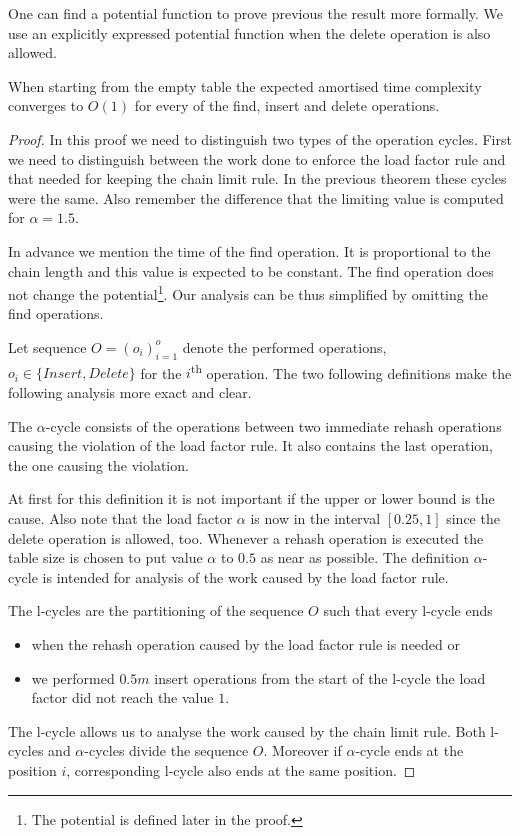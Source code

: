 One can find a potential function to prove previous the result more formally. We use an explicitly expressed potential function when the delete operation is also allowed.

\begin{theorem}
When starting from the empty table the expected amortised time complexity converges to $O(1)$ for every of the find, insert and delete operations.
\end{theorem}
\begin{proof}
In this proof we need to distinguish two types of the operation cycles. First we need to distinguish between the work done to enforce the load factor rule and that needed for keeping the chain limit rule. In the previous theorem these cycles were the same. Also remember the difference that the limiting value is computed for $\alpha = 1.5$.

In advance we mention the time of the find operation. It is proportional to the chain length and this value is expected to be constant. The find operation does not change the potential\footnote{The potential is defined later in the proof.}. Our analysis can be thus simplified by omitting the find operations.

Let sequence $O = (o_i)_{i=1}^o$ denote the performed operations, $o_i \in \lbrace Insert, Delete \rbrace$ for the $i$\textsuperscript{th} operation. The two following definitions make the following analysis more exact and clear.

\begin{definition}
The $\alpha$-cycle consists of the operations between two immediate rehash operations causing the violation of the load factor rule. It also contains the last operation, the one causing the violation.
\end{definition}
At first for this definition it is not important if the upper or lower bound is the cause. Also note that the load factor $\alpha$ is now in the interval $\left[0.25, 1\right]$ since the delete operation is allowed, too. Whenever a rehash operation is executed the table size is chosen to put value $\alpha$ to $0.5$ as near as possible. The definition $\alpha$-cycle is intended for analysis of the work caused by the load factor rule.

\begin{definition}[l-cycle]
The l-cycles are the partitioning of the sequence $O$ such that every l-cycle ends
\begin{itemize}
\item when the rehash operation caused by the load factor rule is needed or
\item we performed $0.5 m$ insert operations from the start of the l-cycle the load factor did not reach the value $1$.
\end{itemize}
\end{definition}
The l-cycle allows us to analyse the work caused by the chain limit rule. Both l-cycles and $\alpha$-cycles divide the sequence $O$. Moreover if $\alpha$-cycle ends at the position $i$, corresponding l-cycle also ends at the same position. 


\end{proof}
